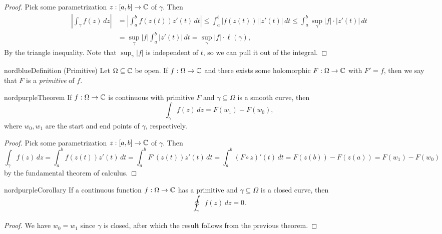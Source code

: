 \begin{proof}
  Pick some parametrization $z : [a, b] \to \mathbb{C}$ of
  $\gamma$. Then
  \begin{align*}
    \left|\int_{\gamma} f(z) \, dz\right|
    &= \left|\int_a^b f(z(t)) z'(t)\, dt\right|
    \le \int_a^b |f(z(t))| |z'(t)|\, dt
    \le \int_a^b \sup_{\gamma} |f| \cdot |z'(t)|\, dt \\
    &= \sup_{\gamma} |f| \int_a^b |z'(t)|\, dt
    = \sup_{\gamma} |f| \cdot \ell(\gamma),
  \end{align*}
  By the triangle inequality. Note that
  $\sup_{\gamma} |f|$ is independent of $t$, so we
  can pull it out of the integral.
\end{proof}

\begin{mybox}{nordblue}{Definition (Primitive)}
  Let $\Omega \subseteq \mathbb{C}$ be open.
  If $f : \Omega \to \mathbb{C}$ and there exists some
  holomorphic $F : \Omega \to \mathbb{C}$
  with $F' = f$, then we say that $F$ is a
  \textit{primitive} of $f$.
\end{mybox}

\begin{mybox}{nordpurple}{Theorem}
  If $f : \Omega \to \mathbb{C}$ is continuous with
  primitive $F$ and $\gamma \subseteq \Omega$
  is a smooth curve, then
  \[
    \int_{\gamma} f(z) \, dz = F(w_1) - F(w_0),
  \]
  where $w_0, w_1$ are the start and end points of
  $\gamma$, respectively.
\end{mybox}

\begin{proof}
  Pick some parametrization $z : [a, b] \to \mathbb{C}$ of
  $\gamma$. Then
  \[
    \int_{\gamma} f(z) \, dz
    = \int_a^b f(z(t)) z'(t)\, dt
    = \int_a^b F'(z(t)) z'(t)\, dt
    = \int_a^b (F \circ z)'(t)\, dt
    = F(z(b)) - F(z(a))
    = F(w_1) - F(w_0)
  \]
  by the fundamental theorem of calculus.
\end{proof}

\begin{mybox}{nordpurple}{Corollary}
  If a continuous function $f : \Omega \to \mathbb{C}$ has a
  primitive and
  $\gamma \subseteq \Omega$ is a closed curve, then
  \[
    \oint_{\gamma} f(z) \, dz = 0.
  \]
\end{mybox}

\begin{proof}
  We have $w_0 = w_1$ since $\gamma$ is closed,
  after which the result follows from the previous
  theorem.
\end{proof}

